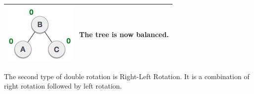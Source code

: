 \begin{longtable}{| M{.20\textwidth} | p{.80\textwidth} |}
\hline
\includegraphics[scale=.40]{images/balanced_avl_tree.jpg} & The tree is now balanced. \\ 
\hline
\end{longtable}

\hypertarget{right-left-rotation}{%
\label{right-left-rotation}}

The second type of double rotation is Right-Left Rotation. It is a
combination of right rotation followed by left rotation.

